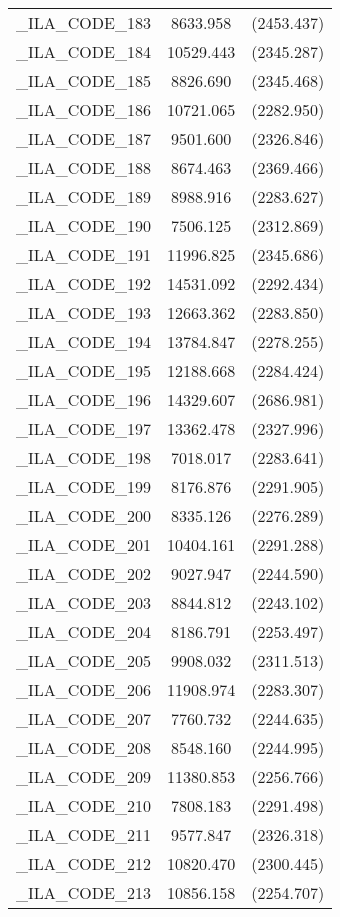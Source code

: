 {\begin{table}[htbp]
\begin{tabular}{l c c }
\_ILA\_CODE\_183  &  8633.958  & (2453.437)\\
\_ILA\_CODE\_184  &  10529.443  & (2345.287)\\
\_ILA\_CODE\_185  &  8826.690  & (2345.468)\\
\_ILA\_CODE\_186  &  10721.065  & (2282.950)\\
\_ILA\_CODE\_187  &  9501.600  & (2326.846)\\
\_ILA\_CODE\_188  &  8674.463  & (2369.466)\\
\_ILA\_CODE\_189  &  8988.916  & (2283.627)\\
\_ILA\_CODE\_190  &  7506.125  & (2312.869)\\
\_ILA\_CODE\_191  &  11996.825  & (2345.686)\\
\_ILA\_CODE\_192  &  14531.092  & (2292.434)\\
\_ILA\_CODE\_193  &  12663.362  & (2283.850)\\
\_ILA\_CODE\_194  &  13784.847  & (2278.255)\\
\_ILA\_CODE\_195  &  12188.668  & (2284.424)\\
\_ILA\_CODE\_196  &  14329.607  & (2686.981)\\
\_ILA\_CODE\_197  &  13362.478  & (2327.996)\\
\_ILA\_CODE\_198  &  7018.017  & (2283.641)\\
\_ILA\_CODE\_199  &  8176.876  & (2291.905)\\
\_ILA\_CODE\_200  &  8335.126  & (2276.289)\\
\_ILA\_CODE\_201  &  10404.161  & (2291.288)\\
\_ILA\_CODE\_202  &  9027.947  & (2244.590)\\
\_ILA\_CODE\_203  &  8844.812  & (2243.102)\\
\_ILA\_CODE\_204  &  8186.791  & (2253.497)\\
\_ILA\_CODE\_205  &  9908.032  & (2311.513)\\
\_ILA\_CODE\_206  &  11908.974  & (2283.307)\\
\_ILA\_CODE\_207  &  7760.732  & (2244.635)\\
\_ILA\_CODE\_208  &  8548.160  & (2244.995)\\
\_ILA\_CODE\_209  &  11380.853  & (2256.766)\\
\_ILA\_CODE\_210  &  7808.183  & (2291.498)\\
\_ILA\_CODE\_211  &  9577.847  & (2326.318)\\
\_ILA\_CODE\_212  &  10820.470  & (2300.445)\\
\_ILA\_CODE\_213  &  10856.158  & (2254.707)\\

\end{tabular}
\end{table}}
